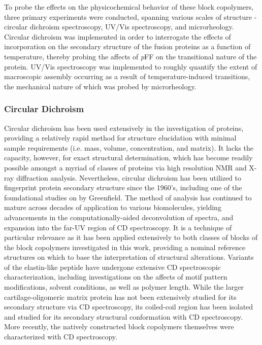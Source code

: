 \begin{refsection}

To probe the effects on the physicochemical behavior of these block copolymers,
three primary experiments were conducted, spanning various scales of structure -
circular dichroism spectroscopy, UV/Vis spectroscopy, and microrheology.
Circular dichroism was implemented in order to interrogate the effects of
incorporation on the secondary structure of the fusion proteins as a function of
temperature, thereby probing the affects of \emph{p}FF on the transitional
nature of the protein. UV/Vis spectroscopy was implemented to roughly quantify
the extent of macroscopic assembly occurring as a result of temperature-induced
transitions, the mechanical nature of which was probed by microrheology. 

\subsubsection{Circular Dichroism} Circular dichroism has been used extensively
in the investigation of proteins, providing a relatively rapid method for
structure elucidation with minimal sample requirements (i.e. mass, volume,
concentration, and matrix). It lacks the capacity, however, for exact structural
determination, which has become readily possible amongst a myriad of classes of
proteins via high resolution NMR and X-ray diffraction analysis.\cite{Adler1973}
Nevertheless, circular dichroism has been utilized to fingerprint protein
secondary structure since the 1960's, including one of the foundational studies
on  by Greenfield.\cite{Greenfield1969} The method
of analysis has continued to mature across decades of application to various
biomolecules, yielding advancements in the computationally-aided deconvolution
of
spectra,\cite{Andrade1993,Sreerama1993,Manavalan1987,Provencher1981,Johnson1999}
and expansion into the far-UV region of CD
spectroscopy.\cite{Brahms1980,Wallace2009,Miles2006} It is a technique of
particular relevance as it has been applied extensively to both classes of
blocks of the block copolymers investigated in this work, providing a nominal
reference structures on which to base the interpretation of structural
alterations. Variants of the elastin-like peptide have undergone extensive CD
spectroscopic characterization, including investigations on the affects of motif
pattern modifications,\cite{Nuhn2008,Kim2005} solvent conditions,\cite{URRY1974}
as well as polymer length.\cite{Nuhn2008,Urry1986,Reiersen1998} While the larger
cartilage-oligomeric matrix protein has not been extensively studied for its
secondary structure via CD spectroscopy, its coiled-coil region has been
isolated and studied for its secondary structural conformation with CD
spectroscopy.\cite{Gunasekar2009,Terskikh1997} More recently, the natively
constructed block copolymers themselves were characterized with CD
spectroscopy.\cite{Haghpanah2009}


\end{refsection}
